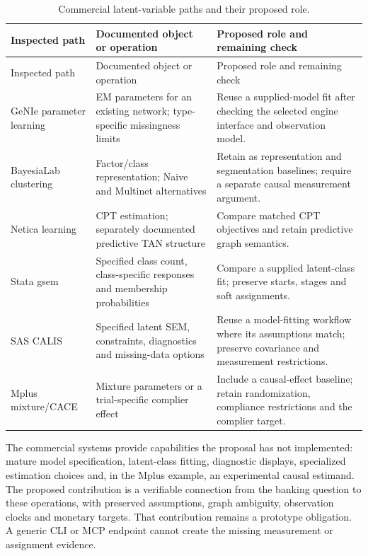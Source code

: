 \begin{longtable}{@{}P{.22\linewidth}P{.35\linewidth}P{.35\linewidth}@{}}
\caption{Commercial latent-variable paths and their proposed role.}
\label{exec13:latent-commercial-table}\\
\toprule
Inspected path & Documented object or operation & Proposed role and remaining check \\
\midrule
\endfirsthead
\toprule
Inspected path & Documented object or operation & Proposed role and remaining check \\
\midrule
\endhead
GeNIe parameter learning & EM parameters for an existing network; type-specific missingness limits & Reuse a supplied-model fit after checking the selected engine interface and observation model. \\
BayesiaLab clustering & Factor/class representation; Naive and Multinet alternatives & Retain as representation and segmentation baselines; require a separate causal measurement argument. \\
Netica learning & CPT estimation; separately documented predictive TAN structure & Compare matched CPT objectives and retain predictive graph semantics. \\
Stata gsem & Specified class count, class-specific responses and membership probabilities & Compare a supplied latent-class fit; preserve starts, stages and soft assignments. \\
SAS CALIS & Specified latent SEM, constraints, diagnostics and missing-data options & Reuse a model-fitting workflow where its assumptions match; preserve covariance and measurement restrictions. \\
Mplus mixture/CACE & Mixture parameters or a trial-specific complier effect & Include a causal-effect baseline; retain randomization, compliance restrictions and the complier target. \\
\bottomrule
\end{longtable}

The commercial systems provide capabilities the proposal has not
implemented: mature model specification, latent-class fitting,
diagnostic displays, specialized estimation choices and, in the Mplus
example, an experimental causal estimand. The proposed contribution is a
verifiable connection from the banking question to these operations,
with preserved assumptions, graph ambiguity, observation clocks and
monetary targets. That contribution remains a prototype obligation. A
generic CLI or MCP endpoint cannot create the missing measurement or
assignment evidence.

